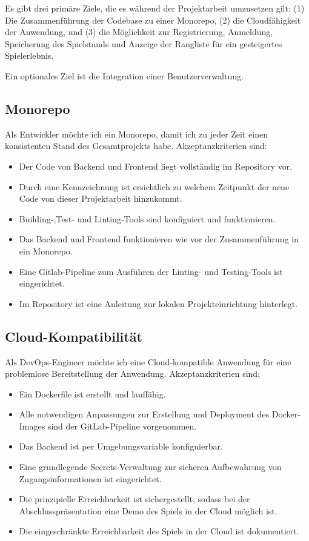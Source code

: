 \documentclass[letterpaper, 10 pt, conference]{ieeeconf}
\begin{document}
Es gibt drei primäre Ziele, die es während der Projektarbeit umzusetzen gilt: (1) Die Zusammenführung der Codebase zu einer Monorepo, (2) die Cloudfähigkeit der Anwendung,  und (3) die Möglichkeit zur Registrierung,  Anmeldung,  Speicherung des Spielstands und Anzeige der Rangliste für ein gesteigertes Spielerlebnis.  

Ein optionales Ziel ist die Integration einer Benutzerverwaltung.

\subsection{Monorepo}

Als Entwickler möchte ich ein Monorepo, damit ich zu jeder Zeit einen konsistenten Stand des Gesamtprojekts habe.  Akzeptanzkriterien sind:
\begin{itemize}
\item Der Code von Backend und Frontend liegt vollständig im Repository vor.
\item Durch eine Kennzeichnung ist ersichtlich zu welchem Zeitpunkt der neue Code von dieser Projektarbeit hinzukommt. 
\item Building-,Test- und Linting-Tools sind konfiguiert und funktionieren.
\item Das Backend und Frontend funktionieren wie vor der Zusammenführung in ein Monorepo.
\item Eine Gitlab-Pipeline zum Ausführen der Linting- und Testing-Tools ist eingerichtet.
\item Im Repository ist eine Anleitung zur lokalen Projekteinrichtung hinterlegt.
\end{itemize}

\subsection{Cloud-Kompatibilität}

Als DevOps-Engineer möchte ich eine Cloud-kompatible Anwendung für eine problemlose Bereitstellung der Anwendung.  Akzeptanzkriterien sind:
\begin{itemize}
\item Ein Dockerfile ist erstellt und lauffähig.
\item Alle notwendigen Anpassungen zur Erstellung und Deployment des Docker-Images sind der GitLab-Pipeline vorgenommen.
\item Das Backend ist per Umgebungsvariable konfiguierbar.
\item Eine grundlegende Secrets-Verwaltung zur sicheren Aufbewahrung von Zugangsinformationen ist eingerichtet.
\item Die prinzipielle Erreichbarkeit ist sichergestellt,  sodass bei der Abschlusspräsentation eine Demo des Spiels in der Cloud möglich ist.
\item Die eingeschränkte Erreichbarkeit des Spiels in der Cloud ist dokumentiert.
\end{itemize}
\end{document}
